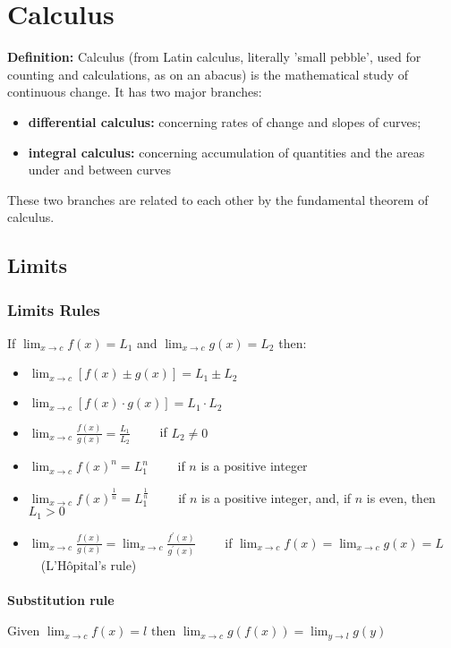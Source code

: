 \chapter{Calculus}
\textbf{Definition:} Calculus (from Latin calculus, literally 'small pebble', used for counting and calculations, as on an abacus) is the mathematical study of continuous change. It has two major branches:
\begin{itemize}  
	\item \textbf{differential calculus:} concerning rates of change and slopes of curves;
	\item \textbf{integral calculus:} concerning accumulation of quantities and the areas under and between curves
\end{itemize}
These two branches are related to each other by the fundamental theorem of calculus. 


\section{Limits}
\subsection{Limits Rules}
If $ \lim_{x \rightarrow c }f(x) = L_1 $ and $ \lim_{x \rightarrow c } g(x) = L_2 $ then:

\begin{itemize}
	\item $ \displaystyle \lim_{x \rightarrow c} \left[ f(x) \pm g(x) \right] = L_1 \pm L_2 $
	\item $ \displaystyle \lim_{x \rightarrow c} \left[ f(x) \cdot g(x) \right] = L_1 \cdot L_2 $
	\item $ \displaystyle \lim_{x \rightarrow c} \frac{f(x)}{g(x)} = \frac{L_1}{L_2} $ \ \ \ \  if $L_2 \ne 0$
	\item $ \displaystyle \lim_{x \rightarrow c} f(x)^n = L_1^n $ \ \ \ \  if $n$ is a positive integer
	\item $ \displaystyle \lim_{x \rightarrow c} f(x)^{\frac{1}{n}} = L_1^{\frac{1}{n}} $ \ \ \ \  if $n$ is a positive integer, and, if $n$ is even, then $L_1>0$
	\item $ \displaystyle \lim_{x \rightarrow c} \frac{f(x)}{g(x)} = \lim_{x \rightarrow c} \frac{f^\prime(x)}{g^\prime(x)}$ \ \ \ \ if $ \lim_{x \rightarrow c } f(x) = \lim_{x \rightarrow c } g(x) = L $ \ \ (L'Hôpital's rule)
\end{itemize}

\subsubsection{Substitution rule}
 $ \displaystyle 
\text{Given  } \lim_{x\rightarrow c}f(x)=l \text{   then   } \lim_{x\rightarrow c}g(f(x))=\lim_{y\rightarrow l}g(y) 
$

